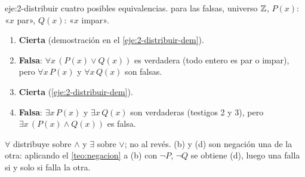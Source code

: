 \begin{solucion}{eje:2-distribuir}
\datos cuatro posibles equivalencias.
\planteamiento para las falsas, universo $\mathbb{Z}$, $P(x)$: «$x$ par», $Q(x)$: «$x$ impar».
\pasos
\begin{enumerate}[label=(\alph*)]
  \item \textbf{Cierta} (demostración en el \cref{eje:2-distribuir-dem}).
  \item \textbf{Falsa}: $\forall x\,(P(x)\vee Q(x))$ es verdadera (todo entero es par o impar), pero $\forall x\,P(x)$ y $\forall x\,Q(x)$ son falsas.
  \item \textbf{Cierta} (\cref{eje:2-distribuir-dem}).
  \item \textbf{Falsa}: $\exists x\,P(x)$ y $\exists x\,Q(x)$ son verdaderas (testigos 2 y 3), pero $\exists x\,(P(x)\wedge Q(x))$ es falsa.
\end{enumerate}
\resultado $\forall$ distribuye sobre $\wedge$ y $\exists$ sobre $\vee$; no al revés.
\comprobacion (b) y (d) son negación una de la otra: aplicando el \cref{teo:negacion} a (b) con $\neg P$, $\neg Q$ se obtiene (d), luego una falla si y solo si falla la otra.
\end{solucion}

